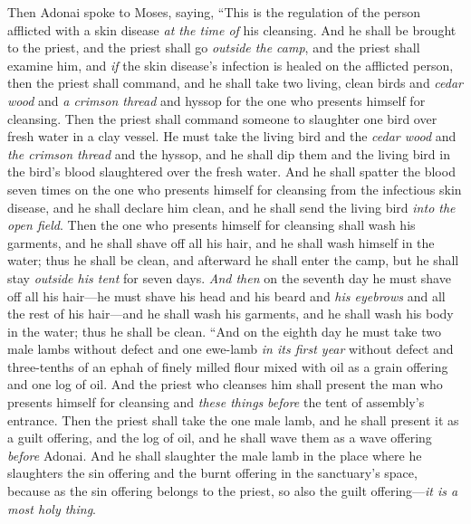 \begin{biblechapter} %
 Then Adonai spoke to Moses, saying,
\verse “This is the regulation of the person afflicted with a skin disease \textit{at the time of} his cleansing. And he shall be brought to the priest,
\verse and the priest shall go \textit{outside the camp}, and the priest shall examine him, and \textit{if} the skin disease’s infection is healed on the afflicted person,
\verse then the priest shall command, and he shall take two living, clean birds and \textit{cedar wood} and \textit{a crimson thread} and hyssop for the one who presents himself for cleansing.
\verse Then the priest shall command someone to slaughter one bird over fresh water in a clay vessel.
\verse He must take the living bird and the \textit{cedar wood} and \textit{the crimson thread} and the hyssop, and he shall dip them and the living bird in the bird’s blood slaughtered over the fresh water.
\verse And he shall spatter the blood seven times on the one who presents himself for cleansing from the infectious skin disease, and he shall declare him clean, and he shall send the living bird \textit{into the open field}.
\verse Then the one who presents himself for cleansing shall wash his garments, and he shall shave off all his hair, and he shall wash himself in the water; thus he shall be clean, and afterward he shall enter the camp, but he shall stay \textit{outside his tent} for seven days.
\verse \textit{And then} on the seventh day he must shave off all his hair—he must shave his head and his beard and \textit{his eyebrows} and all the rest of his hair—and he shall wash his garments, and he shall wash his body in the water; thus he shall be clean.
\verse “And on the eighth day he must take two male lambs without defect and one ewe-lamb \textit{in its first year} without defect and three-tenths of an ephah of finely milled flour mixed with oil as a grain offering and one log of oil.
\verse And the priest who cleanses him shall present the man who presents himself for cleansing and \textit{these things} \textit{before} the tent of assembly’s entrance.
\verse Then the priest shall take the one male lamb, and he shall present it as a guilt offering, and the log of oil, and he shall wave them as a wave offering \textit{before} Adonai.
\verse And he shall slaughter the male lamb in the place where he slaughters the sin offering and the burnt offering in the sanctuary’s space, because as the sin offering belongs to the priest, so also the guilt offering—\textit{it is a most holy thing}.

\end{biblechapter}
